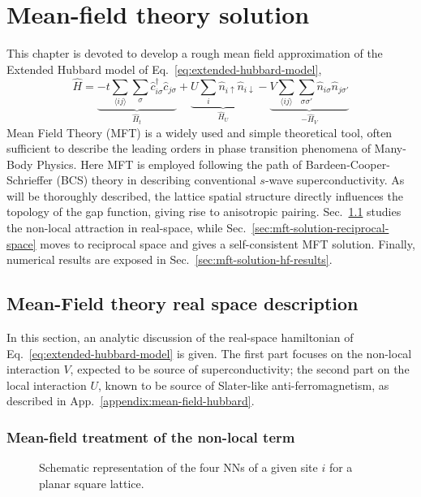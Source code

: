 \chapter{Mean-field theory solution}\label{chap:mft-solution}

This chapter is devoted to develop a rough mean field approximation of the Extended Hubbard model of Eq.~\eqref{eq:extended-hubbard-model},
\[
	\hat H =
	\underbrace{
		-t \sum_{\langle ij \rangle} \sum_\sigma \hat c_{i\sigma}^\dagger \hat c_{j\sigma}
	}_{\hat H_t} + \underbrace{
		U \sum_i \hat n_{i\uparrow} \hat n_{i\downarrow}
	}_{\hat H_U}
	- \underbrace{
		V \sum_{\langle ij \rangle} \sum_{\sigma \sigma'} \hat n_{i\sigma} \hat n_{j\sigma'}
	}_{- \hat H_V}
\]
Mean Field Theory (MFT) is a widely used and simple theoretical tool, often sufficient to describe the leading orders in phase transition phenomena of Many-Body Physics. Here MFT is employed following the path of Bardeen-Cooper-Schrieffer (BCS) theory in describing conventional $s$-wave superconductivity. As will be thoroughly described, the lattice spatial structure directly influences the topology of the gap function, giving rise to anisotropic pairing. Sec.~\ref{sec:mft-solution-real-space} studies the non-local attraction in real-space, while Sec.~\ref{sec:mft-solution-reciprocal-space} moves to reciprocal space and gives a self-consistent MFT solution. Finally, numerical results are exposed in Sec.~\ref{sec:mft-solution-hf-results}.

\section{Mean-Field theory real space description}\label{sec:mft-solution-real-space}

In this section, an analytic discussion of the real-space hamiltonian of Eq.~\eqref{eq:extended-hubbard-model} is given. The first part focuses on the non-local interaction $V$, expected to be source of superconductivity; the second part on the local interaction $U$, known to be source of Slater-like anti-ferromagnetism, as described in App.~\ref{appendix:mean-field-hubbard}.

\subsection{Mean-field treatment of the non-local term}

\begin{figure}
	\centering
	
	\caption{Schematic representation of the four NNs of a given site $i$ for a planar square lattice.}
	\label{fig:square-nearest-neighbors}
\end{figure}

